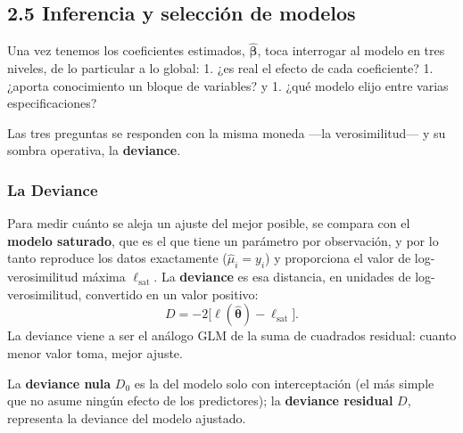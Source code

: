 \documentclass[
  letterpaper,
  DIV=11,
  numbers=noendperiod]{scrartcl}
\begin{document}
\hypertarget{sec-u12-inferencia}{%
\subsection{2.5 Inferencia y selección de
modelos}\label{sec-u12-inferencia}}

Una vez tenemos los coeficientes estimados, \(\hat{\boldsymbol\beta}\),
toca interrogar al modelo en tres niveles, de lo particular a lo global:
1. ¿es real el efecto de cada coeficiente? 1. ¿aporta conocimiento un
bloque de variables? y 1. ¿qué modelo elijo entre varias
especificaciones?

Las tres preguntas se responden con la misma moneda ---la
verosimilitud--- y su sombra operativa, la \textbf{deviance}.

\hypertarget{la-deviance}{%
\subsubsection{La Deviance}\label{la-deviance}}

Para medir cuánto se aleja un ajuste del mejor posible, se compara con
el \textbf{modelo saturado}, que es el que tiene un parámetro por
observación, y por lo tanto reproduce los datos exactamente
(\(\hat\mu_i=y_i\)) y proporciona el valor de log-verosimilitud máxima
\(\ell_{\text{sat}}\). La \textbf{deviance} es esa distancia, en
unidades de log-verosimilitud, convertido en un valor positivo: \[
D=-2\bigl[\ell(\hat{\boldsymbol\theta})-\ell_{\text{sat}}\bigr].
\] La deviance viene a ser el análogo GLM de la suma de cuadrados
residual: cuanto menor valor toma, mejor ajuste.

La \textbf{deviance nula} \(D_0\) es la del modelo solo con
interceptación (el más simple que no asume ningún efecto de los
predictores); la \textbf{deviance residual} \(D\), representa la
deviance del modelo ajustado.
\end{document}
